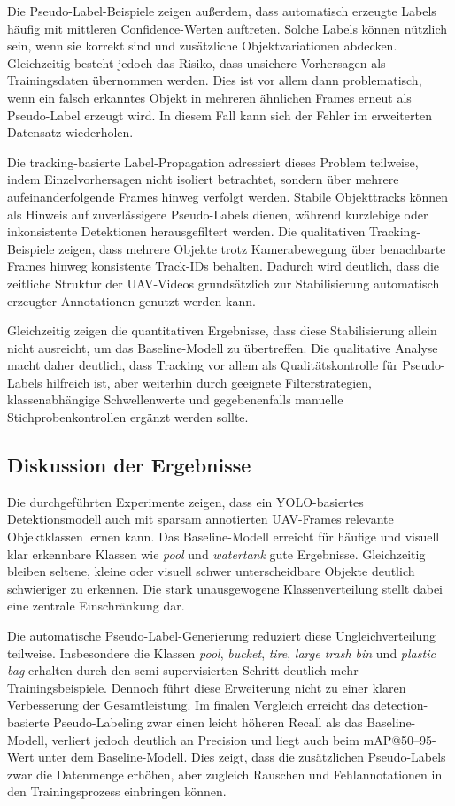 Die Pseudo-Label-Beispiele zeigen außerdem, dass automatisch erzeugte Labels
häufig mit mittleren Confidence-Werten auftreten. Solche Labels können nützlich
sein, wenn sie korrekt sind und zusätzliche Objektvariationen abdecken.
Gleichzeitig besteht jedoch das Risiko, dass unsichere Vorhersagen als
Trainingsdaten übernommen werden. Dies ist vor allem dann problematisch, wenn
ein falsch erkanntes Objekt in mehreren ähnlichen Frames erneut als Pseudo-Label
erzeugt wird. In diesem Fall kann sich der Fehler im erweiterten Datensatz
wiederholen.

Die tracking-basierte Label-Propagation adressiert dieses Problem teilweise, indem
Einzelvorhersagen nicht isoliert betrachtet, sondern über mehrere aufeinanderfolgende
Frames hinweg verfolgt werden. Stabile Objekttracks können als Hinweis auf
zuverlässigere Pseudo-Labels dienen, während kurzlebige oder inkonsistente
Detektionen herausgefiltert werden. Die qualitativen Tracking-Beispiele zeigen,
dass mehrere Objekte trotz Kamerabewegung über benachbarte Frames hinweg
konsistente Track-IDs behalten. Dadurch wird deutlich, dass die zeitliche Struktur
der UAV-Videos grundsätzlich zur Stabilisierung automatisch erzeugter Annotationen
genutzt werden kann.

Gleichzeitig zeigen die quantitativen Ergebnisse, dass diese Stabilisierung allein
nicht ausreicht, um das Baseline-Modell zu übertreffen. Die qualitative Analyse
macht daher deutlich, dass Tracking vor allem als Qualitätskontrolle für
Pseudo-Labels hilfreich ist, aber weiterhin durch geeignete Filterstrategien,
klassenabhängige Schwellenwerte und gegebenenfalls manuelle Stichprobenkontrollen
ergänzt werden sollte.

\subsection{Diskussion der Ergebnisse}

Die durchgeführten Experimente zeigen, dass ein YOLO-basiertes Detektionsmodell
auch mit sparsam annotierten UAV-Frames relevante Objektklassen lernen kann.
Das Baseline-Modell erreicht für häufige und visuell klar erkennbare Klassen wie
\textit{pool} und \textit{watertank} gute Ergebnisse. Gleichzeitig bleiben seltene,
kleine oder visuell schwer unterscheidbare Objekte deutlich schwieriger zu erkennen.
Die stark unausgewogene Klassenverteilung stellt dabei eine zentrale Einschränkung
dar.

Die automatische Pseudo-Label-Generierung reduziert diese Ungleichverteilung
teilweise. Insbesondere die Klassen \textit{pool}, \textit{bucket}, \textit{tire},
\textit{large trash bin} und \textit{plastic bag} erhalten durch den
semi-supervisierten Schritt deutlich mehr Trainingsbeispiele. Dennoch führt diese
Erweiterung nicht zu einer klaren Verbesserung der Gesamtleistung. Im finalen
Vergleich erreicht das detection-basierte Pseudo-Labeling zwar einen leicht höheren
Recall als das Baseline-Modell, verliert jedoch deutlich an Precision und liegt auch
beim mAP@50--95-Wert unter dem Baseline-Modell. Dies zeigt, dass die zusätzlichen
Pseudo-Labels zwar die Datenmenge erhöhen, aber zugleich Rauschen und
Fehlannotationen in den Trainingsprozess einbringen können.

